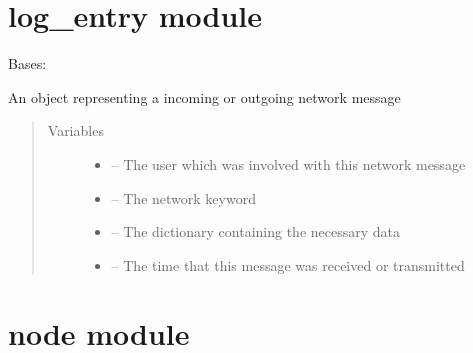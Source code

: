 \documentclass[letterpaper,10pt,english]{sphinxmanual}
\begin{document}
\section{log\_entry module}
\label{\detokenize{log_entry:log-entry-module}}\label{\detokenize{log_entry::doc}}\label{\detokenize{log_entry:module-log_entry}}

\begin{fulllineitems}
\label{\detokenize{log_entry:log_entry.LogEntry}}
Bases: 

An object representing a incoming or outgoing network message
\begin{quote}\begin{description}
\item[{Variables}] \leavevmode\begin{itemize}
\item {} 
{\hyperref[\detokenize{user:module-user}]{}} -- The user which was involved with this network message

\item {} 
\href{https://docs.python.org/2/library/keyword.html\#module-keyword}{} -- The network keyword

\item {} 
 -- The dictionary containing the necessary data

\item {} 
\href{https://docs.python.org/2/library/time.html\#module-time}{} -- The time that this message was received or transmitted

\end{itemize}

\end{description}\end{quote}

\end{fulllineitems}



\section{node module}
\label{\detokenize{node:module-node}}\label{\detokenize{node::doc}}\label{\detokenize{node:node-module}}
\end{document}
